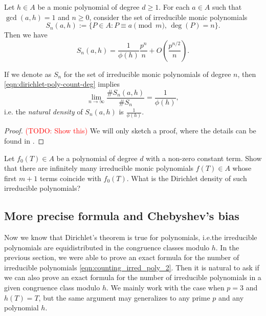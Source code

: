 \begin{corollary}
    Let $h \in A$ be a monic polynomial of degree $d \ge 1$.
    For each $a \in A$ such that $\gcd(a, h) = 1$ and $n \ge 0$, consider the set of irreducible monic polynomials
    \begin{equation}
        S_n(a, h) := \{P \in A : P \equiv a\pmod{m}, \,\deg(P) = n\}.
    \end{equation}
    Then we have
    \begin{equation}
        S_n(a, h) = \frac{1}{\phi(h)} \frac{p^n}{n} + O\left(\frac{p^{n/2}}{n}\right).
        \label{eqn:dirichlet-poly-count-deg}
    \end{equation}
\end{corollary}
If we denote as $S_n$ for the set of irreducible monic polynomials of degree $n$, then \eqref{eqn:dirichlet-poly-count-deg} implies
\[
\lim_{n \to \infty} \frac{\# S_n(a, h)}{\# S_n} = \frac{1}{\phi(h)},
\]
i.e. the \emph{natural density} of $S_n(a, h)$ is $\frac{1}{\phi(h)}$.
\begin{proof}
    \textcolor{red}{(TODO: Show this)}
    We will only sketch a proof, where the details can be found in \cite[p. 40, Theorem 4.8]{rosen2013number}.
\end{proof}

\begin{exercise}
    Let $f_0(T) \in A$ be a polynomial of degree $d$ with a non-zero constant term.
    Show that there are infinitely many irreducible monic polynomials $f(T) \in A$ whose first $m + 1$ terms coincide with $f_0(T)$.
    What is the Dirichlet density of such irreducible polynomials?
\end{exercise}


\subsection{More precise formula and Chebyshev's bias}
\label{sec:dirichlet-more-precise}

Now we know that Dirichlet's theorem is true for polynomials, i.e.the irreducible polynomials are equidistributed in the congruence classes modulo $h$.
In the previous section, we were able to prove an exact formula for the number of irreducible polynomials \eqref{eqn:counting_irred_poly_2}.
Then it is natural to ask if we can also prove an exact formula for the number of irreducible polynomials in a given congruence class modulo $h$.
We mainly work with the case when $p = 3$ and $h(T) = T$, but the same argument may generalizes to any prime $p$ and any polynomial $h$.

